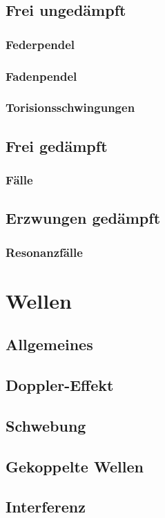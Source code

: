 \documentclass[german]{latex4ei/latex4ei_sheet}
\begin{document}
\subsection{Frei ungedämpft}
\subsubsection{Federpendel}
\subsubsection{Fadenpendel}
\subsubsection{Torisionsschwingungen}
\subsection{Frei gedämpft}
\subsubsection{Fälle}
\subsection{Erzwungen gedämpft}
\subsubsection{Resonanzfälle}

\section{Wellen}
\subsection{Allgemeines}
\subsection{Doppler-Effekt}
\subsection{Schwebung}
\subsection{Gekoppelte Wellen}
\subsection{Interferenz}
\end{document}
